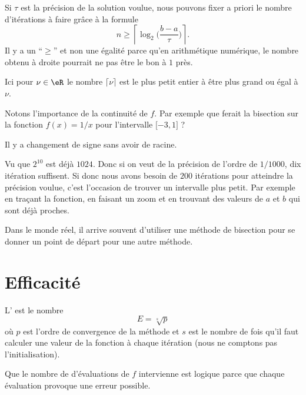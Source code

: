 Si \( \tau\) est la précision de la solution voulue, nous pouvons fixer a priori le nombre d'itérations à faire grâce à la formule
\begin{equation}
    n\geq\left\lceil  \log_2\big( \frac{ b-a }{ \tau } \big)  \right\rceil.
\end{equation}
Il y a un ``\( \geq\)'' et non une égalité parce qu'en arithmétique numérique, le nombre obtenu à droite pourrait ne pas être le bon à \( 1\) près.

Ici pour \( \nu\in \eR\) le nombre \( \lceil\nu\rceil\) est le plus petit entier à être plus grand ou égal à \( \nu\).

\begin{normaltext}
    Notons l'importance de la continuité de \( f\). Par exemple que ferait la bisection sur la fonction \( f(x)=1/x\) pour l'intervalle $\mathopen[ -3 , 1 \mathclose]$ ? 

    Il y a changement de signe sans avoir de racine.
\end{normaltext} 

Vu que \( 2^{10}\) est déjà \( 1024\). Donc si on veut de la précision de l'ordre de \( 1/1000\), dix itération suffisent. Si donc nous avons besoin de \( 200\) itérations pour atteindre la précision voulue, c'est l'occasion de trouver un intervalle plus petit. Par exemple en traçant la fonction, en faisant un zoom et en trouvant des valeurs de \( a\) et \( b\) qui sont déjà proches.


\begin{normaltext}
    Dans le monde réel, il arrive souvent d'utiliser une méthode de bisection pour se donner un point de départ pour une autre méthode.
\end{normaltext}

\section{Efficacité}

\begin{definition}
    L' est le nombre
    \begin{equation}
        E=\sqrt[s]{ p }
    \end{equation}
    où \( p\) est l'ordre de convergence de la méthode et \( s\) est le nombre de fois qu'il faut calculer une valeur de la fonction à chaque itération (nous ne comptons pas l'initialisation).
\end{definition}
Que le nombre de d'évaluations de \( f\) intervienne est logique parce que chaque évaluation provoque une erreur possible.

